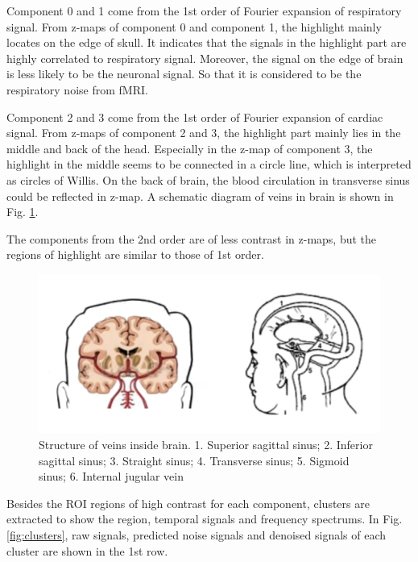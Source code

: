 Component 0 and 1 come from the 1st order of Fourier expansion of respiratory signal.
From z-maps of component 0 and component 1, the highlight mainly locates on the edge of skull. 
It indicates that the signals in the highlight part are highly correlated to respiratory signal. Moreover,
the signal on the edge of brain is less likely to be the neuronal signal. So that it is considered to be
the respiratory noise from fMRI.

Component 2 and 3 come from the 1st order of Fourier expansion of cardiac signal.
From z-maps of component 2 and 3, the highlight part mainly lies in the middle and back of the head.
Especially in the z-map of component 3, the highlight in the middle seems to be connected in a circle line, which is 
interpreted as circles of Willis. On the back of brain, the blood circulation in transverse sinus
could be reflected in z-map. A schematic diagram of veins in brain is shown in Fig. \ref{fig:brain}.

The components from the 2nd order are of less contrast in z-maps, but the regions of highlight
are similar to those of 1st order.

\begin{figure}[htp]
  \centering
  \includegraphics[width=\columnwidth]{Figures/brain.jpeg}
  \caption{Structure of veins inside brain. 1. Superior sagittal sinus; 2. Inferior sagittal sinus;
  3. Straight sinus; 4. Transverse sinus; 5. Sigmoid sinus; 6. Internal jugular vein   }
  \label{fig:brain}
\end{figure} 

Besides the ROI regions of high contrast for each component, clusters are extracted to show the region,
temporal signals and frequency spectrums. In Fig. \ref{fig:clusters}, raw signals, predicted noise signals and 
denoised signals of each cluster are shown in the 1st row.




